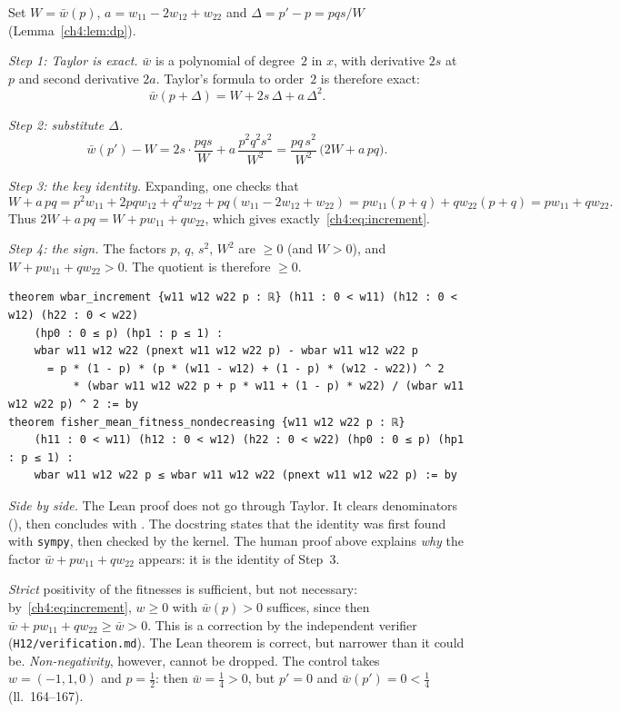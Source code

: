 \begin{humanproof}
Set $W=\bar w(p)$, $a=w_{11}-2w_{12}+w_{22}$ and $\Delta=p'-p=pqs/W$ (Lemma~\ref{ch4:lem:dp}).

\emph{Step 1: Taylor is exact.} $\bar w$ is a polynomial of degree~$2$ in $x$, with derivative $2s$ at $p$ and
second derivative $2a$. Taylor's formula to order~$2$ is therefore exact:
\[
\bar w(p+\Delta)=W+2s\,\Delta+a\,\Delta^2 .
\]

\emph{Step 2: substitute $\Delta$.}
\[
\bar w(p')-W=2s\cdot\frac{pqs}{W}+a\,\frac{p^2q^2s^2}{W^2}=\frac{pq\,s^2}{W^2}\,\bigl(2W+a\,pq\bigr).
\]

\emph{Step 3: the key identity.} Expanding, one checks that
\[
W+a\,pq=p^2w_{11}+2pqw_{12}+q^2w_{22}+pq(w_{11}-2w_{12}+w_{22})=pw_{11}(p+q)+qw_{22}(p+q)=pw_{11}+qw_{22}.
\]
Thus $2W+a\,pq=W+pw_{11}+qw_{22}$, which gives exactly~\eqref{ch4:eq:increment}.

\emph{Step 4: the sign.} The factors $p$, $q$, $s^2$, $W^2$ are $\ge0$ (and $W>0$), and
$W+pw_{11}+qw_{22}>0$. The quotient is therefore $\ge0$.
\end{humanproof}

\begin{leanbox}
\begin{lstlisting}[language=Lean]
theorem wbar_increment {w11 w12 w22 p : ℝ} (h11 : 0 < w11) (h12 : 0 < w12) (h22 : 0 < w22)
    (hp0 : 0 ≤ p) (hp1 : p ≤ 1) :
    wbar w11 w12 w22 (pnext w11 w12 w22 p) - wbar w11 w12 w22 p
      = p * (1 - p) * (p * (w11 - w12) + (1 - p) * (w12 - w22)) ^ 2
          * (wbar w11 w12 w22 p + p * w11 + (1 - p) * w22) / (wbar w11 w12 w22 p) ^ 2 := by
theorem fisher_mean_fitness_nondecreasing {w11 w12 w22 p : ℝ}
    (h11 : 0 < w11) (h12 : 0 < w12) (h22 : 0 < w22) (hp0 : 0 ≤ p) (hp1 : p ≤ 1) :
    wbar w11 w12 w22 p ≤ wbar w11 w12 w22 (pnext w11 w12 w22 p) := by
\end{lstlisting}
\emph{Side by side.} The Lean proof does not go through Taylor. It clears denominators (),
then concludes with . The docstring states that the identity was first found with \texttt{sympy}, then
checked by the kernel. The human proof above explains \emph{why} the factor
$\bar w+pw_{11}+qw_{22}$ appears: it is the identity of Step~3.
\end{leanbox}

\begin{remark}\label{ch4:rem:positivite}
\emph{Strict} positivity of the fitnesses is sufficient, but not necessary: by~\eqref{ch4:eq:increment},
$w\ge0$ with $\bar w(p)>0$ suffices, since then $\bar w+pw_{11}+qw_{22}\ge\bar w>0$. This is a correction by the
independent verifier (\texttt{H12/verification.md}). The Lean theorem is correct, but narrower than it
could be. \emph{Non-negativity}, however, cannot be dropped. The control
 takes $w=(-1,1,0)$ and $p=\frac12$: then $\bar w=\frac14>0$, but $p'=0$ and
$\bar w(p')=0<\frac14$ \tierA{} (ll.~164--167).
\end{remark}


